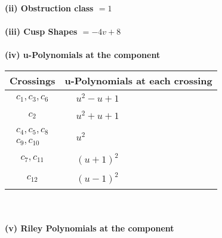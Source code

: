 \documentclass[1p]{elsarticle_modified}
\theoremstyle{definition}
\begin{document}
\flushleft \textbf{(ii) Obstruction class $= 1$}\\~\\
\flushleft \textbf{(iii) Cusp Shapes $= -4 v+8$}\\~\\
\newpage\renewcommand{\arraystretch}{1}
\flushleft \textbf{(iv) u-Polynomials at the component}\newline \\
\begin{tabular}{m{50pt}|m{274pt}}
Crossings & \hspace{64pt}u-Polynomials at each crossing \\
\hline $$\begin{aligned}c_{1},c_{3},c_{6}\end{aligned}$$&$\begin{aligned}
&u^2- u+1
\end{aligned}$\\
\hline $$\begin{aligned}c_{2}\end{aligned}$$&$\begin{aligned}
&u^2+u+1
\end{aligned}$\\
\hline $$\begin{aligned}c_{4},c_{5},c_{8}\\c_{9},c_{10}\end{aligned}$$&$\begin{aligned}
&u^2
\end{aligned}$\\
\hline $$\begin{aligned}c_{7},c_{11}\end{aligned}$$&$\begin{aligned}
&(u+1)^2
\end{aligned}$\\
\hline $$\begin{aligned}c_{12}\end{aligned}$$&$\begin{aligned}
&(u-1)^2
\end{aligned}$\\
\hline
\end{tabular}\\~\\
\newpage\renewcommand{\arraystretch}{1}
\flushleft \textbf{(v) Riley Polynomials at the component}\newline \\
\end{document}
